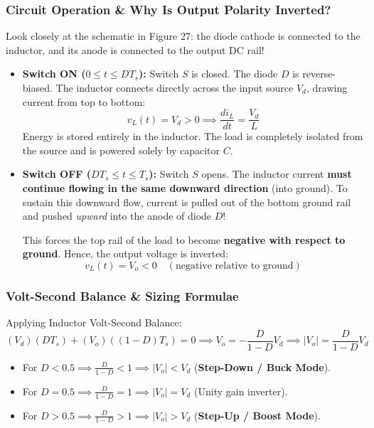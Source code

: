 \documentclass[11pt,a4paper]{article}
\renewcommand{\boxed}[1]{#1}
\begin{document}
\subsubsection{Circuit Operation \& Why Is Output Polarity Inverted?}
Look closely at the schematic in Figure 27: the diode cathode is connected to the inductor, and its anode is connected to the output DC rail!
\begin{itemize}[leftmargin=*]
  \item \textbf{Switch ON ($0 \le t \le D T_s$):}
  Switch $S$ is closed. The diode $D$ is reverse-biased. The inductor connects directly across the input source $V_d$, drawing current from top to bottom:
  \[
  v_L(t) = V_d > 0 \implies \frac{di_L}{dt} = \frac{V_d}{L}
  \]
  Energy is stored entirely in the inductor. The load is completely isolated from the source and is powered solely by capacitor $C$.
  
  \item \textbf{Switch OFF ($D T_s \le t \le T_s$):}
  Switch $S$ opens. The inductor current \textbf{must continue flowing in the same downward direction} (into ground). To sustain this downward flow, current is pulled out of the bottom ground rail and pushed \textit{upward} into the anode of diode $D$!
  
  This forces the top rail of the load to become \textbf{negative with respect to ground}. Hence, the output voltage is inverted:
  \[
  v_L(t) = V_o < 0 \quad (\text{negative relative to ground})
  \]
\end{itemize}

\subsubsection{Volt-Second Balance \& Sizing Formulae}
Applying Inductor Volt-Second Balance:
\[
(V_d)(D T_s) + (V_o)((1 - D) T_s) = 0 \implies \boxed{V_o = -\frac{D}{1 - D} V_d \implies |V_o| = \frac{D}{1 - D} V_d}
\]
\begin{formulabox}
\begin{itemize}[leftmargin=*]
  \item For $D < 0.5 \implies \frac{D}{1 - D} < 1 \implies |V_o| < V_d$ (\textbf{Step-Down / Buck Mode}).
  \item For $D = 0.5 \implies \frac{D}{1 - D} = 1 \implies |V_o| = V_d$ (Unity gain inverter).
  \item For $D > 0.5 \implies \frac{D}{1 - D} > 1 \implies |V_o| > V_d$ (\textbf{Step-Up / Boost Mode}).
\end{itemize}
\end{formulabox}
\end{document}
